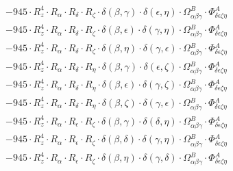 \documentclass{article}
\begin{document}
\begin{equation}
\begin{array}{c}
 \\[0.2em] 		 - 945 \cdot R_{z}^{4} \cdot R_{\alpha{}} \cdot R_{\delta{}} \cdot R_{\zeta{}} \cdot \delta{}\left(\beta{}, \gamma{}\right) \cdot \delta{}\left(\epsilon{}, \eta{}\right) \cdot \Omega{}^{B}_{\alpha{}\beta{}\gamma{}} \cdot \Phi{}^{A}_{\delta{}\epsilon{}\zeta{}\eta{}} 
 \\[0.2em] 		 - 945 \cdot R_{z}^{4} \cdot R_{\alpha{}} \cdot R_{\delta{}} \cdot R_{\zeta{}} \cdot \delta{}\left(\beta{}, \epsilon{}\right) \cdot \delta{}\left(\gamma{}, \eta{}\right) \cdot \Omega{}^{B}_{\alpha{}\beta{}\gamma{}} \cdot \Phi{}^{A}_{\delta{}\epsilon{}\zeta{}\eta{}} 
 \\[0.2em] 		 - 945 \cdot R_{z}^{4} \cdot R_{\alpha{}} \cdot R_{\delta{}} \cdot R_{\zeta{}} \cdot \delta{}\left(\beta{}, \eta{}\right) \cdot \delta{}\left(\gamma{}, \epsilon{}\right) \cdot \Omega{}^{B}_{\alpha{}\beta{}\gamma{}} \cdot \Phi{}^{A}_{\delta{}\epsilon{}\zeta{}\eta{}} 
 \\[0.2em] 		 - 945 \cdot R_{z}^{4} \cdot R_{\alpha{}} \cdot R_{\delta{}} \cdot R_{\eta{}} \cdot \delta{}\left(\beta{}, \gamma{}\right) \cdot \delta{}\left(\epsilon{}, \zeta{}\right) \cdot \Omega{}^{B}_{\alpha{}\beta{}\gamma{}} \cdot \Phi{}^{A}_{\delta{}\epsilon{}\zeta{}\eta{}} 
 \\[0.2em] 		 - 945 \cdot R_{z}^{4} \cdot R_{\alpha{}} \cdot R_{\delta{}} \cdot R_{\eta{}} \cdot \delta{}\left(\beta{}, \epsilon{}\right) \cdot \delta{}\left(\gamma{}, \zeta{}\right) \cdot \Omega{}^{B}_{\alpha{}\beta{}\gamma{}} \cdot \Phi{}^{A}_{\delta{}\epsilon{}\zeta{}\eta{}} 
 \\[0.2em] 		 - 945 \cdot R_{z}^{4} \cdot R_{\alpha{}} \cdot R_{\delta{}} \cdot R_{\eta{}} \cdot \delta{}\left(\beta{}, \zeta{}\right) \cdot \delta{}\left(\gamma{}, \epsilon{}\right) \cdot \Omega{}^{B}_{\alpha{}\beta{}\gamma{}} \cdot \Phi{}^{A}_{\delta{}\epsilon{}\zeta{}\eta{}} 
 \\[0.2em] 		 - 945 \cdot R_{z}^{4} \cdot R_{\alpha{}} \cdot R_{\epsilon{}} \cdot R_{\zeta{}} \cdot \delta{}\left(\beta{}, \gamma{}\right) \cdot \delta{}\left(\delta{}, \eta{}\right) \cdot \Omega{}^{B}_{\alpha{}\beta{}\gamma{}} \cdot \Phi{}^{A}_{\delta{}\epsilon{}\zeta{}\eta{}} 
 \\[0.2em] 		 - 945 \cdot R_{z}^{4} \cdot R_{\alpha{}} \cdot R_{\epsilon{}} \cdot R_{\zeta{}} \cdot \delta{}\left(\beta{}, \delta{}\right) \cdot \delta{}\left(\gamma{}, \eta{}\right) \cdot \Omega{}^{B}_{\alpha{}\beta{}\gamma{}} \cdot \Phi{}^{A}_{\delta{}\epsilon{}\zeta{}\eta{}} 
 \\[0.2em] 		 - 945 \cdot R_{z}^{4} \cdot R_{\alpha{}} \cdot R_{\epsilon{}} \cdot R_{\zeta{}} \cdot \delta{}\left(\beta{}, \eta{}\right) \cdot \delta{}\left(\gamma{}, \delta{}\right) \cdot \Omega{}^{B}_{\alpha{}\beta{}\gamma{}} \cdot \Phi{}^{A}_{\delta{}\epsilon{}\zeta{}\eta{}} 

\end{array}
\end{equation}
\end{document}
